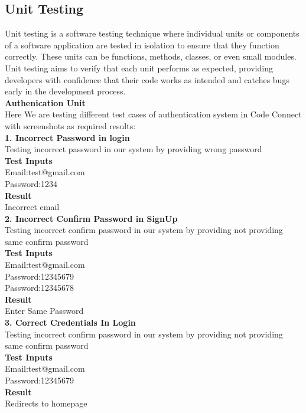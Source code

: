 \subsection{Unit Testing}
Unit testing is a software testing technique where individual units or components of a software application are tested in isolation to ensure that they function correctly. These units can be functions, methods, classes, or even small modules. Unit testing aims to verify that each unit performs as expected, providing developers with confidence that their code works as intended and catches bugs early in the development process.
\\
\textbf{Authenication Unit}\\
Here We are testing different test cases of authentication system in Code Connect with screenshots as required results:\\
\textbf{1. Incorrect Password in login}\\
Testing incorrect password in our system by providing wrong password\\
\textbf{Test Inputs}\\
Email:test@gmail.com \\
Password:1234\\
\textbf{Result}\\
Incorrect email\\
\textbf{2. Incorrect Confirm Password in SignUp}\\
Testing incorrect confirm password in our system by providing not providing same confirm password\\
\textbf{Test Inputs}\\
Email:test@gmail.com \\
Password:12345679\\
Password:12345678\\
\textbf{Result}\\
Enter Same Password\\
\textbf{3. Correct Credentials In Login}\\
Testing incorrect confirm password in our system by providing not providing same confirm password\\
\textbf{Test Inputs}\\
Email:test@gmail.com \\
Password:12345679\\
\textbf{Result}\\
Redirects to homepage\\



